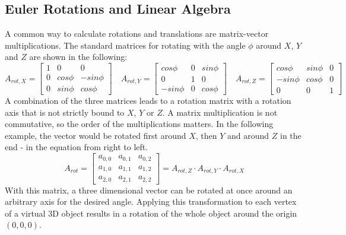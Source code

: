 \subsection{Euler Rotations and Linear Algebra}
A common way to calculate rotations and translations are matrix-vector multiplications. The standard matrices for rotating with the angle $\phi$ around $X$, $Y$ and $Z$ are shown in the following:
\begin{equation*}
    A_{rot,X} = 
    \begin{bmatrix}
    1 & 0 & 0 \\
    0 & cos \phi & -sin \phi \\
    0 & sin \phi & cos \phi
    \end{bmatrix}
    \quad
    A_{rot,Y} = 
    \begin{bmatrix}
    cos \phi & 0 & sin \phi \\
    0 & 1 & 0 \\
    -sin \phi & 0 & cos \phi
    \end{bmatrix}    
    \quad
    A_{rot,Z} = 
    \begin{bmatrix}
    cos \phi & sin \phi & 0 \\
    -sin \phi & cos \phi & 0 \\
    0 & 0 & 1
    \end{bmatrix} 
\end{equation*}
A combination of the three matrices leads to a rotation matrix with a rotation axis that is not strictly bound to $X$, $Y$ or $Z$. A matrix multiplication is not commutative, so the order of the multiplications matters. In the following example, the vector would be rotated first around $X$, then $Y$ and around $Z$ in the end - in the equation from right to left.
\begin{equation*}
    A_{rot} = 
    \begin{bmatrix}
    a_{0,0} & a_{0,1} & a_{0,2}  \\
    a_{1,0} & a_{1,1} & a_{1,2}  \\
    a_{2,0} & a_{2,1} & a_{2,2} 
    \end{bmatrix}
    =A_{rot,Z} \cdot A_{rot,Y} \cdot A_{rot,X}
\end{equation*}
With this matrix, a three dimensional vector can be rotated at once around an arbitrary axis for the desired angle. Applying this transformation to each vertex of a virtual 3D object results in a rotation of the whole object around the origin $(0,0,0)$.\\

